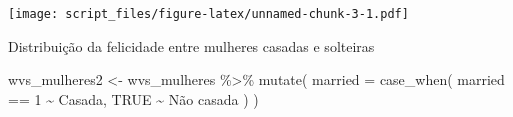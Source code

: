 \documentclass[
]{article}
\newenvironment{Shaded}{\begin{snugshade}}{\end{snugshade}}
\newcommand{\AttributeTok}[1]{\textcolor[rgb]{0.77,0.63,0.00}{#1}}
\newcommand{\ConstantTok}[1]{\textcolor[rgb]{0.00,0.00,0.00}{#1}}
\newcommand{\DecValTok}[1]{\textcolor[rgb]{0.00,0.00,0.81}{#1}}
\newcommand{\FunctionTok}[1]{\textcolor[rgb]{0.00,0.00,0.00}{#1}}
\newcommand{\NormalTok}[1]{#1}
\newcommand{\OtherTok}[1]{\textcolor[rgb]{0.56,0.35,0.01}{#1}}
\newcommand{\SpecialCharTok}[1]{\textcolor[rgb]{0.00,0.00,0.00}{#1}}
\newcommand{\StringTok}[1]{\textcolor[rgb]{0.31,0.60,0.02}{#1}}
\begin{document}
\texttt{[image: script\_files/figure-latex/unnamed-chunk-3-1.pdf]}

Distribuição da felicidade entre mulheres casadas e solteiras

\begin{Shaded}
\begin{Highlighting}[]
\NormalTok{wvs\_mulheres2 }\OtherTok{\textless{}{-}}\NormalTok{ wvs\_mulheres }\SpecialCharTok{\%\textgreater{}\%} 
  \FunctionTok{mutate}\NormalTok{(}
    \AttributeTok{married =} \FunctionTok{case\_when}\NormalTok{(}
\NormalTok{      married }\SpecialCharTok{==} \DecValTok{1} \SpecialCharTok{\textasciitilde{}} \StringTok{\textquotesingle{}Casada\textquotesingle{}}\NormalTok{,}
      \ConstantTok{TRUE} \SpecialCharTok{\textasciitilde{}} \StringTok{\textquotesingle{}Não casada\textquotesingle{}}
\NormalTok{    )}
\NormalTok{  )}


\end{Highlighting}
\end{Shaded}
\end{document}
